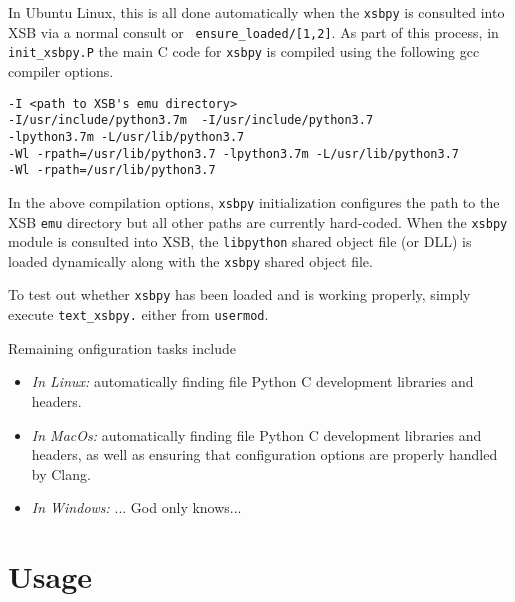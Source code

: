 In Ubuntu Linux, this is all done automatically when the {\tt xsbpy}
is consulted into XSB via a normal consult or {\tt
  ensure\_loaded/[1,2]}.  As part of this process, in {\tt
  init\_xsbpy.P} the main C code for {\tt xsbpy} is compiled using the
following gcc compiler options.  
\begin{verbatim}
-I <path to XSB's emu directory>  
-I/usr/include/python3.7m  -I/usr/include/python3.7  
-lpython3.7m -L/usr/lib/python3.7 
-Wl -rpath=/usr/lib/python3.7 -lpython3.7m -L/usr/lib/python3.7 
-Wl -rpath=/usr/lib/python3.7
\end{verbatim}

\noindent
In the above compilation options, {\tt xsbpy} initialization
configures the path to the XSB {\tt emu} directory but all other paths
are currently hard-coded.
When the {\tt xsbpy} module is
consulted into XSB, the {\tt libpython} shared object file (or DLL) is
loaded dynamically along with the {\tt xsbpy} shared object file.

To test out whether {\tt xsbpy} has been loaded and is working
properly, simply execute {\tt text\_xsbpy.} either from {\tt usermod}.

Remaining onfiguration tasks include

\begin{itemize}
\item {\em In Linux:} automatically finding file Python C development
  libraries and headers.
\item {\em In MacOs:} automatically finding file Python C development
  libraries and headers, as well as ensuring that configuration
  options are properly handled by Clang.
\item {\em In Windows:} ... God only knows...
\end{itemize}

\section{Usage}

